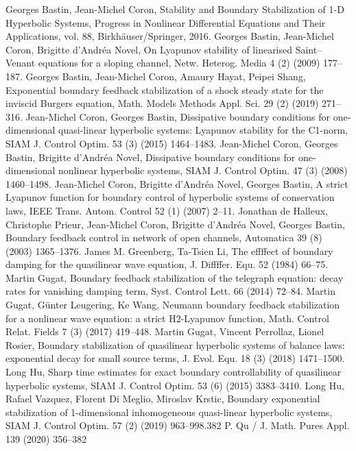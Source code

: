\documentclass[notitlepage,cs4size,punct,oneside]{ctexrep}
\numberwithin{equation}{chapter}
\theoremstyle{mystyle}
\begin{document}
\begin{thebibliography}{99}
     Georges Bastin, Jean-Michel Coron, Stability and Boundary Stabilization of 1-D Hyperbolic Systems, Progress in Nonlinear Differential Equations and Their Applications, vol. 88, Birkhäuser/Springer, 2016.
     Georges Bastin, Jean-Michel Coron, Brigitte d'Andréa Novel, On Lyapunov stability of linearised Saint--Venant equations for a sloping channel, Netw. Heterog. Media 4 (2) (2009) 177--187.
     Georges Bastin, Jean-Michel Coron, Amaury Hayat, Peipei Shang, Exponential boundary feedback stabilization of a shock steady state for the inviscid Burgers equation, Math. Models Methods Appl. Sci. 29 (2) (2019) 271--316.
     Jean-Michel Coron, Georges Bastin, Dissipative boundary conditions for one-dimensional quasi-linear hyperbolic systems: Lyapunov stability for the C1-norm, SIAM J. Control Optim. 53 (3) (2015) 1464--1483.
     Jean-Michel Coron, Georges Bastin, Brigitte d'Andréa Novel, Dissipative boundary conditions for one-dimensional nonlinear hyperbolic systems, SIAM J. Control Optim. 47 (3) (2008) 1460--1498.
     Jean-Michel Coron, Brigitte d'Andréa Novel, Georges Bastin, A strict Lyapunov function for boundary control of hyperbolic systems of conservation laws, IEEE Trans. Autom. Control 52 (1) (2007) 2--11.
     Jonathan de Halleux, Christophe Prieur, Jean-Michel Coron, Brigitte d'Andréa Novel, Georges Bastin, Boundary feedback control in network of open channels, Automatica 39 (8) (2003) 1365--1376.
     James M. Greenberg, Ta-Tsien Li, The effffect of boundary damping for the quasilinear wave equation, J. Diffffer. Equ. 52 (1984) 66--75.
     Martin Gugat, Boundary feedback stabilization of the telegraph equation: decay rates for vanishing damping term, Syst. Control Lett. 66 (2014) 72--84.
     Martin Gugat, Günter Leugering, Ke Wang, Neumann boundary feedback stabilization for a nonlinear wave equation: a strict H2-Lyapunov function, Math. Control Relat. Fields 7 (3) (2017) 419--448.
     Martin Gugat, Vincent Perrollaz, Lionel Rosier, Boundary stabilization of quasilinear hyperbolic systems of balance laws: exponential decay for small source terms, J. Evol. Equ. 18 (3) (2018) 1471--1500.
     Long Hu, Sharp time estimates for exact boundary controllability of quasilinear hyperbolic systems, SIAM J. Control Optim. 53 (6) (2015) 3383--3410.
     Long Hu, Rafael Vazquez, Florent Di Meglio, Miroslav Krstic, Boundary exponential stabilization of 1-dimensional inhomogeneous quasi-linear hyperbolic systems, SIAM J. Control Optim. 57 (2) (2019) 963--998.382 P. Qu / J. Math. Pures Appl. 139 (2020) 356--382

\end{thebibliography}
\end{document}
